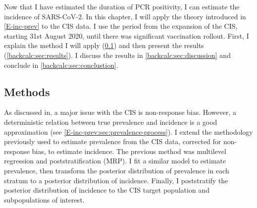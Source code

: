 \documentclass[thesis.tex]{subfiles}
\begin{document}
Now that I have estimated the duration of PCR positivity, I can estimate the incidence of SARS-CoV-2.
In this chapter, I will apply the theory introduced in \cref{E-inc-prev} to the CIS data.
I use the period from the expansion of the CIS, starting 31st August 2020, until there was significant vaccination rollout.
First, I explain the method I will apply (\cref{backcalc:sec:methods}) and then present the results (\cref{backcalc:sec:results}).
I discuss the results in \cref{backcalc:sec:discussion} and conclude in \cref{backcalc:sec:conclustion}.


\subsection{Methods} \label{backcalc:sec:methods}

As discussed in, a major issue with the CIS is non-response bias.
However, a deterministic relation between true prevalence and incidence is a good approximation (see \cref{E-inc-prev:sec:prevalence-process}).
I extend the methodology previously used to estimate prevalence from the CIS data, corrected for non-response bias, to estimate incidence.
The previous method was multilevel regression and poststratification (MRP).
I fit a similar model to estimate prevalence, then transform the posterior distribution of prevalence in each stratum to a posterior distribution of incidence.
Finally, I poststratify the posterior distribution of incidence to the CIS target population and subpopulations of interest.
\end{document}
